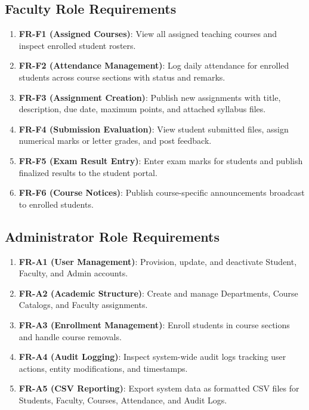 \subsection{Faculty Role Requirements}
\begin{enumerate}
    \item \textbf{FR-F1 (Assigned Courses)}: View all assigned teaching courses and inspect enrolled student rosters.
    \item \textbf{FR-F2 (Attendance Management)}: Log daily attendance for enrolled students across course sections with status and remarks.
    \item \textbf{FR-F3 (Assignment Creation)}: Publish new assignments with title, description, due date, maximum points, and attached syllabus files.
    \item \textbf{FR-F4 (Submission Evaluation)}: View student submitted files, assign numerical marks or letter grades, and post feedback.
    \item \textbf{FR-F5 (Exam Result Entry)}: Enter exam marks for students and publish finalized results to the student portal.
    \item \textbf{FR-F6 (Course Notices)}: Publish course-specific announcements broadcast to enrolled students.
\end{enumerate}

\subsection{Administrator Role Requirements}
\begin{enumerate}
    \item \textbf{FR-A1 (User Management)}: Provision, update, and deactivate Student, Faculty, and Admin accounts.
    \item \textbf{FR-A2 (Academic Structure)}: Create and manage Departments, Course Catalogs, and Faculty assignments.
    \item \textbf{FR-A3 (Enrollment Management)}: Enroll students in course sections and handle course removals.
    \item \textbf{FR-A4 (Audit Logging)}: Inspect system-wide audit logs tracking user actions, entity modifications, and timestamps.
    \item \textbf{FR-A5 (CSV Reporting)}: Export system data as formatted CSV files for Students, Faculty, Courses, Attendance, and Audit Logs.
\end{enumerate}


